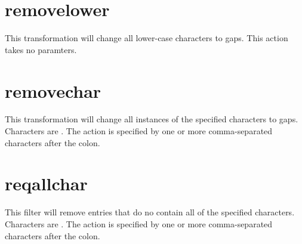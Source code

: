 \documentclass[letterpaper,11pt,english]{sphinxmanual}
\begin{document}
\begin{sphinxVerbatim}[commandchars=\\\{\}]
  
 
 
\end{sphinxVerbatim}


\section{removelower}
\label{\detokenize{mvf_filter_modules:removelower}}
This transformation will change all lower-case characters to gaps.
This action takes no paramters.

\begin{sphinxVerbatim}[commandchars=\\\{\}]
  
 
 
\end{sphinxVerbatim}


\section{removechar}
\label{\detokenize{mvf_filter_modules:removechar}}
This transformation will change all instances of the specified
characters to gaps. Characters are . The action is
specified by one or more comma-separated characters after the colon.

\begin{sphinxVerbatim}[commandchars=\\\{\}]
  
 
 
\end{sphinxVerbatim}


\section{reqallchar}
\label{\detokenize{mvf_filter_modules:reqallchar}}
This filter will remove entries that do no contain all of the specified
characters. Characters are . The action is
specified by one or more comma-separated characters after the colon.
\end{document}
